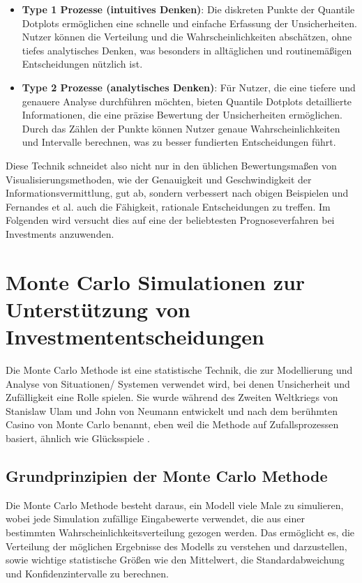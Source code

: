 \begin{itemize}
    \item \textbf{Type 1 Prozesse (intuitives Denken)}: Die diskreten Punkte der Quantile Dotplots ermöglichen eine schnelle und einfache Erfassung der Unsicherheiten. Nutzer können die Verteilung und die Wahrscheinlichkeiten abschätzen, ohne tiefes analytisches Denken, was besonders in alltäglichen und routinemäßigen Entscheidungen nützlich ist.
    \item \textbf{Type 2 Prozesse (analytisches Denken)}: Für Nutzer, die eine tiefere und genauere Analyse durchführen möchten, bieten Quantile Dotplots detaillierte Informationen, die eine präzise Bewertung der Unsicherheiten ermöglichen. Durch das Zählen der Punkte können Nutzer genaue Wahrscheinlichkeiten und Intervalle berechnen, was zu besser fundierten Entscheidungen führt.
\end{itemize}

Diese Technik schneidet also nicht nur in den üblichen Bewertungsmaßen von Visualisierungsmethoden, wie der Genauigkeit und Geschwindigkeit der Informationsvermittlung, gut ab, sondern verbessert nach obigen Beispielen und Fernandes et al. \cite{Fernandes2018} auch die Fähigkeit, rationale Entscheidungen zu treffen. Im Folgenden wird versucht dies auf eine der beliebtesten Prognoseverfahren bei Investments anzuwenden.

\section{Monte Carlo Simulationen zur Unterstützung von Investmententscheidungen}

Die Monte Carlo Methode ist eine statistische Technik, die zur Modellierung und Analyse von Situationen/ Systemen verwendet wird, bei denen Unsicherheit und Zufälligkeit eine Rolle spielen. Sie wurde während des Zweiten Weltkriegs von Stanislaw Ulam und John von Neumann entwickelt und nach dem berühmten Casino von Monte Carlo benannt, eben weil die Methode auf Zufallsprozessen basiert, ähnlich wie Glücksspiele \cite{Walter2014}.

\subsection{Grundprinzipien der Monte Carlo Methode}
Die Monte Carlo Methode besteht daraus, ein Modell viele Male zu simulieren, wobei jede Simulation zufällige Eingabewerte verwendet, die aus einer bestimmten Wahrscheinlichkeitsverteilung gezogen werden. Das ermöglicht es, die Verteilung der möglichen Ergebnisse des Modells zu verstehen und darzustellen, sowie wichtige statistische Größen wie den Mittelwert, die Standardabweichung und Konfidenzintervalle zu berechnen.

